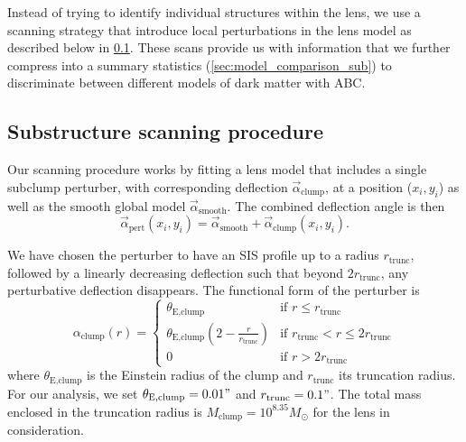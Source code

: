 \documentclass[a4paper,11pt]{article}
\begin{document}
Instead of trying to identify individual structures within the lens, we use a scanning strategy that introduce local perturbations in the lens model as described below in \ref{sec:substructure_scanning}. These scans provide us with information that we further compress into a summary statistics (\ref{sec:model_comparison_sub}) to discriminate between different models of dark matter with ABC.


\subsection{Substructure scanning procedure}\label{sec:substructure_scanning}
Our scanning procedure works by fitting a lens model that includes a single subclump perturber, with corresponding deflection $\vec{\alpha}_{\text{clump}}$, at a position ($x_i,y_i$) as well as the smooth global model $\vec{\alpha}_{\text{smooth}}$. The combined deflection angle is then
\begin{equation}
	\vec{\alpha}_{\text{pert}}(x_i,y_i) = \vec{\alpha}_{\text{smooth}} + \vec{\alpha}_{\text{clump}}(x_i, y_i).
\end{equation}

We have chosen the perturber to have an SIS profile up to a radius $r_{\text{trunc}}$, followed by a linearly decreasing deflection such that beyond $2r_{\text{trunc}}$, any perturbative deflection disappears. The functional form of the perturber is
\begin{equation}
	\alpha_{\text{clump}}(r) =
	\begin{cases}
    \theta_{\text{E,clump}} & \text{if } r \le r_{\text{trunc}}\\
    \theta_{\text{E,clump}} \left(2 - \frac{r}{r_{\text{trunc}}}\right) & \text{if } r_{\text{trunc}} < r \le 2r_{\text{trunc}}\\
    0 & \text{if } r > 2 r_{\text{trunc}}
	\end{cases}
\end{equation}
where $\theta_{\text{E,clump}}$ is the Einstein radius of the clump and $r_{\text{trunc}}$ its truncation radius. For our analysis, we set $\theta_{\text{E,clump}} = 0.01"$ and $r_{\text{trunc}} = 0.1"$. The total mass enclosed in the truncation radius is $M_{\text{clump}} = 10^{8.35}M_{\odot}$ for the lens in consideration. 
\end{document}
